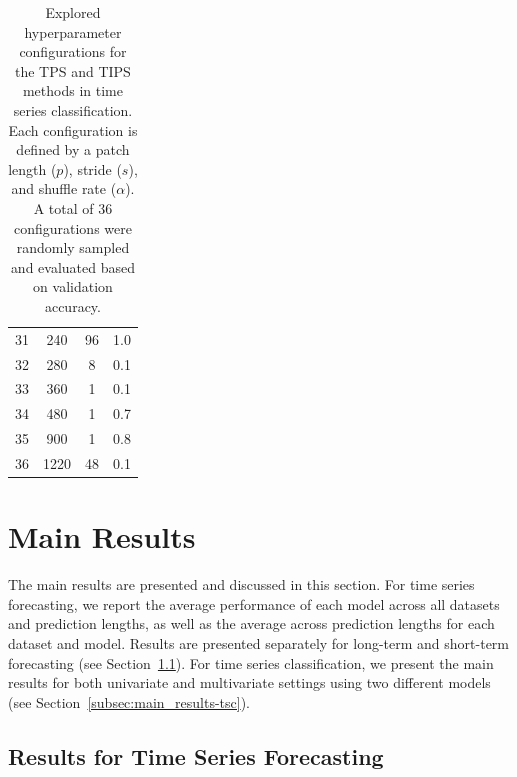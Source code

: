 \begin{table}[h!]
\begin{minipage}[t]{0.48\linewidth}
\begin{tabular}{@{}cccc@{}}
31 & 240  & 96  & 1.0 \\
32 & 280  & 8   & 0.1 \\
33 & 360  & 1   & 0.1 \\
34 & 480  & 1   & 0.7 \\
35 & 900  & 1   & 0.8 \\
36 & 1220 & 48  & 0.1 \\
\bottomrule
\end{tabular}
\end{minipage}
\caption{Explored hyperparameter configurations for the TPS and TIPS methods in time series classification. Each configuration is defined by a patch length ($p$), stride ($s$), and shuffle rate ($\alpha$). A total of 36 configurations were randomly sampled and evaluated based on validation accuracy.}
\label{tab:tps_parameters_split}
\end{table}



\section{Main Results} \label{sec:main_results}

The main results are presented and discussed in this section. For time series forecasting, we report the average performance of each model across all datasets and prediction lengths, as well as the average across prediction lengths for each dataset and model. Results are presented separately for long-term and short-term forecasting (see Section~\ref{subsec:main_results-tsf}). For time series classification, we present the main results for both univariate and multivariate settings using two different models (see Section~\ref{subsec:main_results-tsc}).

\subsection{Results for Time Series Forecasting} \label{subsec:main_results-tsf}


